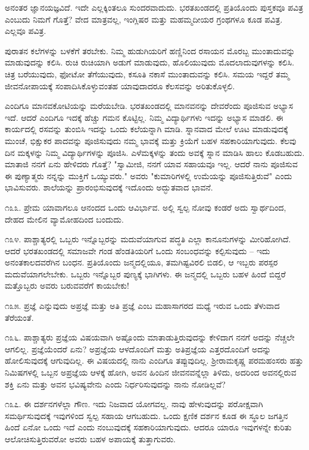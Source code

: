 ಅನಂತರ ಜ್ಞಾನಯಜ್ಞವಿದೆ. ಇದೇ ಎಲ್ಲಕ್ಕಿಂತಲೂ ಸುಂದರವಾದುದು. ಭರತಖಂಡದಲ್ಲಿ ಪ್ರತಿಯೊಂದು ಪುಸ್ತಕವೂ ಪವಿತ್ರ ಎಂಬುದು ನಿಮಗೆ ಗೊತ್ತೆ? ವೇದ ಮಾತ್ರವಲ್ಲ, ಇಂಗ್ಲಿಷರ ಮತ್ತು ಮಹಮ್ಮದೀಯರ ಗ್ರಂಥಗಳೂ ಕೂಡ ಪವಿತ್ರ. ಎಲ್ಲವೂ ಪವಿತ್ರ.

ಪುರಾತನ ಕಲೆಗಳನ್ನು ಬಳಕೆಗೆ ತರಬೇಕು. ನಿಮ್ಮ ಹುಡುಗಿಯರಿಗೆ ಹಣ್ಣಿನಿಂದ ರಸಾಯನ ಮೊರಬ್ಬ ಮುಂತಾದುವನ್ನು ಮಾಡುವುದನ್ನು ಕಲಿಸಿ. ರುಚಿ ರುಚಿಯಾಗಿ ಅಡುಗೆ ಮಾಡುವುದು, ಹೊಲಿಯುವುದು ಮೊದಲಾದುವುಗಳನ್ನು ಕಲಿಸಿ. ಚಿತ್ರ ಬರೆಯುವುದು, ಫೋಟೋ ತೆಗೆಯುವುದು, ಕಸೂತಿ ನಕಾಸೆ ಮುಂತಾದುವನ್ನು ಕಲಿಸಿ. ಸಮಯ ಇದ್ದರೆ ತಮ್ಮ ಜೀವನೋಪಾಯಕ್ಕೆ ಸಂಪಾದಿಸಿಕೊಳ್ಳುವಂತಹ ಯಾವುದಾದರೂ ಕೆಲಸವನ್ನು ಅರಿತುಕೊಳ್ಳಲಿ.

ಎಂದಿಗೂ ಮಾನವಕೋಟಿಯನ್ನು ಮರೆಯಬೇಡಿ. ಭರತಖಂಡದಲ್ಲಿ ಮಾನವನನ್ನು ದೇವರೆಂದು ಪೂಜಿಸುವ ಅಭ್ಯಾಸ ಇದೆ. ಆದರೆ ಎಂದಿಗೂ ಇದಕ್ಕೆ ಹೆಚ್ಚು ಗಮನ ಕೊಟ್ಟಿಲ್ಲ. ನಿಮ್ಮ ವಿದ್ಯಾರ್ಥಿಗಳು ಇದನ್ನು ಅಭ್ಯಾಸ ಮಾಡಲಿ. ಈ ಕಾರ್ಯದಲ್ಲಿ ರಸವನ್ನು ತುಂಬಿಸಿ ಇದನ್ನು ಒಂದು ಕಲೆಯನ್ನಾಗಿ ಮಾಡಿ. ಸ್ನಾನವಾದ ಮೇಲೆ ಊಟ ಮಾಡುವುದಕ್ಕೆ ಮುಂಚೆ, ಭಿಕ್ಷುಕರ ಪಾದವನ್ನು ಪೂಜಿಸುವುದು ನಮ್ಮ ಭಾವಕ್ಕೆ ಮತ್ತು ಕ್ರಿಯೆಗೆ ಬಹಳ ಸಹಕಾರಿಯಾಗುವುದು. ಕೆಲವು ದಿನ ಮಕ್ಕಳನ್ನು ನಿಮ್ಮ ವಿದ್ಯಾರ್ಥಿಗಳನ್ನು ಪೂಜಿಸಿ. ಎಳೆಮಕ್ಕಳನ್ನು ತಂದು ಅವಕ್ಕೆ ಸ್ನಾನ ಮಾಡಿಸಿ ಹಾಲು ಕೊಡಬಹುದು. ಮಾತಾಜಿ ನನಗೆ ಏನು ಹೇಳಿದರು ಗೊತ್ತೆ? "ಸ್ವಾಮೀಜಿ, ನನಗೆ ಯಾವ ಸಹಾಯವೂ ಇಲ್ಲ. ಆದರೆ ನಾನು ಪೂಜಿಸುವ ಈ ಪುಣ್ಯಾತ್ಮರು ನನ್ನನ್ನು ಮುಕ್ತಿಗೆ ಒಯ್ಯುವರು." ಅವರು "ಕುಮಾರಿಗಳಲ್ಲಿ ಉಮೆಯನ್ನು ಪೂಜಿಸುತ್ತಿರುವೆ" ಎಂದು ಭಾವಿಸುವರು. ಶಾಲೆಯನ್ನು ಪ್ರಾರಂಭಿಸುವುದಕ್ಕೆ ಇದೊಂದು ಅದ್ಭುತವಾದ ಭಾವನೆ.

೧೩೩. ಪ್ರೇಮ ಯಾವಾಗಲೂ ಆನಂದದ ಒಂದು ಆವಿರ್ಭಾವ. ಅಲ್ಲಿ ಸ್ವಲ್ಪ ನೋವು ಕಂಡರೆ ಅದು ಸ್ವಾರ್ಥದಿಂದ, ದೇಹದ ಮೇಲಿನ ವ್ಯಾಮೋಹದಿಂದ ಬಂದುದು.

೧೩೪. ಪಾಶ್ಚಾತ್ಯರಲ್ಲಿ ಒಬ್ಬರು ಇನ್ನೊಬ್ಬರನ್ನು ಮದುವೆಯಾಗುವ ಪದ್ಧತಿ ಎಲ್ಲಾ ಕಾನೂನುಗಳನ್ನು ಮೀರಿಹೋಗಿದೆ. ಆದರೆ ಭರತಖಂಡದಲ್ಲಿ ಸಮಾಜವೇ ಗಂಡ ಹೆಂಡತಿಯರಿಗೆ ಒಂದು ಸಂಬಂಧವನ್ನು ಕಲ್ಪಿಸುವುದು – ಇದು ಅನಂತಕಾಲದವರೆಗಿನ ಬಂಧನ. ಪ್ರತಿಯೊಂದು ಜನ್ಮದಲ್ಲಿಯೂ, ತಮಗಿಷ್ಟವಿರಲಿ ಬಿಡಲಿ, ಆ ಇಬ್ಬರು ಪರಸ್ಪರ ಮದುವೆಯಾಗಲೇಬೇಕು. ಒಬ್ಬರು ಇನ್ನೊಬ್ಬರ ಪುಣ್ಯಕ್ಕೆ ಭಾಗಿಗಳು. ಈ ಜನ್ಮದಲ್ಲಿ ಒಬ್ಬರು ಬಹಳ ಹಿಂದೆ ಬಿದ್ದರೆ ಮತ್ತೊಬ್ಬರು ಅವರು ಬರುವವರೆಗೆ ಕಾಯಬೇಕು!

೧೩೫. ಪ್ರಜ್ಞೆ ಎನ್ನುವುದು ಅಪ್ರಜ್ಞೆ  ಮತ್ತು ಅತಿ ಪ್ರಜ್ಞೆ  ಎಂಬ ಮಹಾಸಾಗರದ ಮಧ್ಯೆ ಇರುವ ಒಂದು ತೆಳುವಾದ ತೆರೆಯಂತೆ.

೧೩೬. ಪಾಶ್ಚಾತ್ಯರು ಪ್ರಜ್ಞೆಯ ವಿಷಯವಾಗಿ ಅಷ್ಟೊಂದು ಮಾತಾಡುತ್ತಿರುವುದನ್ನು ಕೇಳಿದಾಗ ನನಗೆ ಅದನ್ನು ನೆಚ್ಚಲೇ ಆಗಲಿಲ್ಲ. ಪ್ರಜ್ಞೆಯೆಂದರೆ ಏನು? ಅಪ್ರಜ್ಞೆಯ ಆಳದೊಂದಿಗೆ ಮತ್ತು ಅತಿಪ್ರಜ್ಞೆಯ ಎತ್ತರದೊಂದಿಗೆ ಅದನ್ನು ಹೋಲಿಸುವುದಕ್ಕೆ ಆಗುವುದಿಲ್ಲ. ಈ ವಿಷಯದಲ್ಲಿ ನಾನು ಎಂದಿಗೂ ತಪ್ಪುವುದಿಲ್ಲ. ಶ‍್ರೀರಾಮಕೃಷ್ಣ ಪರಮಹಂಸರು ಹತ್ತು ನಿಮಿಷಗಳಲ್ಲಿ ಒಬ್ಬನ ಅಪ್ರಜ್ಞೆಯ ಆಳಕ್ಕೆ ಹೋಗಿ, ಅವನ ಹಿಂದಿನ ಜೀವನವನ್ನೆಲ್ಲಾ ತಿಳಿದು, ಅದರಿಂದ ಅವನಲ್ಲಿರುವ ಶಕ್ತಿ ಏನು ಮತ್ತು ಅವನ ಭವಿಷ್ಯವೇನು ಎಂದು ನಿರ್ಧರಿಸುವುದನ್ನು ನಾನು ನೋಡಿಲ್ಲವೆ?

೧೩೭. ಈ ದರ್ಶನಗಳೆಲ್ಲಾ ಗೌಣ. ಇದು ನಿಜವಾದ ಯೋಗವಲ್ಲ. ನಾವು ಹೇಳುವುದನ್ನು ಪರೋಕ್ಷವಾಗಿ ಸಮರ್ಥಿಸುವುದಕ್ಕೆ ಇವುಗಳಿಂದ ಸ್ವಲ್ಪ ಸಹಾಯ ಆಗಬಹುದು. ಒಂದು ಕ್ಷಣಿಕ ದರ್ಶನ ಕೂಡ ಈ ಸ್ಥೂಲ ಜಗತ್ತಿನ ಹಿಂದೆ ಏನೋ ಒಂದು ಇದೆ ಎಂದು ನಂಬುವುದಕ್ಕೆ ಸಹಕಾರಿಯಾಗುವುದು. ಆದರೂ ಯಾರೂ ಇವುಗಳನ್ನೇ ಕುರಿತು ಆಲೋಚಿಸುತ್ತಿರುವರೋ ಅವರು ಬಹಳ ಅಪಾಯಕ್ಕೆ ತುತ್ತಾಗುವರು.

